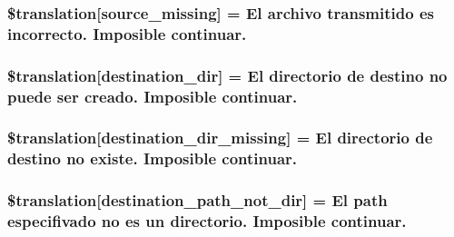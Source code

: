 \subsubsection[{\$translation}]{\setlength{\rightskip}{0pt plus 5cm}\$translation\mbox{[}\textquotesingle{}source\+\_\+missing\textquotesingle{}\mbox{]} = \textquotesingle{}El archivo transmitido es incorrecto. Imposible continuar.\textquotesingle{}}\label{class_8upload_8es___e_s_8php_aceaaf7355acaaf10f0ae60378d03c468}
\hypertarget{class_8upload_8es___e_s_8php_aff2427c72a2598aefa6d58df1dd18b08}{}
\subsubsection[{\$translation}]{\setlength{\rightskip}{0pt plus 5cm}\$translation\mbox{[}\textquotesingle{}destination\+\_\+dir\textquotesingle{}\mbox{]} = \textquotesingle{}El directorio de destino no puede ser creado. Imposible continuar.\textquotesingle{}}\label{class_8upload_8es___e_s_8php_aff2427c72a2598aefa6d58df1dd18b08}
\hypertarget{class_8upload_8es___e_s_8php_a9ef28d3cf09942c6c0a1e77fa09185e8}{}
\subsubsection[{\$translation}]{\setlength{\rightskip}{0pt plus 5cm}\$translation\mbox{[}\textquotesingle{}destination\+\_\+dir\+\_\+missing\textquotesingle{}\mbox{]} = \textquotesingle{}El directorio de destino no existe. Imposible continuar.\textquotesingle{}}\label{class_8upload_8es___e_s_8php_a9ef28d3cf09942c6c0a1e77fa09185e8}
\hypertarget{class_8upload_8es___e_s_8php_a5704a67137126e8c87b7a364175929d4}{}
\subsubsection[{\$translation}]{\setlength{\rightskip}{0pt plus 5cm}\$translation\mbox{[}\textquotesingle{}destination\+\_\+path\+\_\+not\+\_\+dir\textquotesingle{}\mbox{]} = \textquotesingle{}El path especifivado no es un directorio. Imposible continuar.\textquotesingle{}}\label{class_8upload_8es___e_s_8php_a5704a67137126e8c87b7a364175929d4}
\hypertarget{class_8upload_8es___e_s_8php_a97608ea194a616db49141a0e6dee900c}{}
